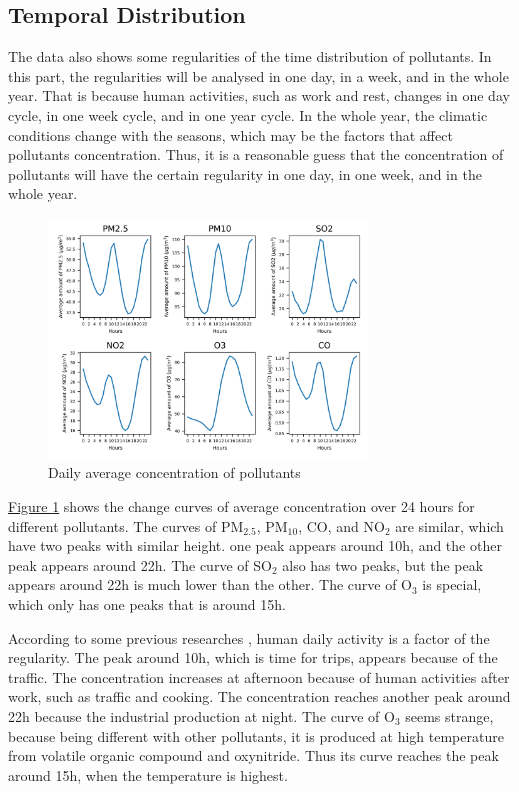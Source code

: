 \documentclass[letterpaper]{article}
\begin{document}
\begin{CJK*}{UTF8}{gkai}
\section{Temporal Distribution}

The data also shows some regularities of the time distribution of pollutants. In this part, the regularities will be analysed in one day, in a week, and in the whole year. That is because human activities, such as work and rest, changes in one day cycle, in one week cycle, and in one year cycle. In the whole year, the climatic conditions change with the seasons, which may be the factors that affect pollutants concentration. Thus, it is a reasonable guess that the concentration of pollutants will have the certain regularity in one day, in one week, and in the whole year.

\begin{figure}[h]
  \includegraphics[width = 8.5cm]{dailyavg_pltn.png}
  \caption{Daily average concentration of pollutants}
  \label{figure:2}
\end{figure}

\hyperref[figure:2]{Figure \ref*{figure:2}} shows the change curves of average concentration over 24 hours for different pollutants. The curves of PM$_{2.5}$, PM$_{10}$, CO, and NO$_{2}$ are similar, which have two peaks with similar height. one peak appears around 10h, and the other peak appears around 22h. The curve of SO$_{2}$ also has two peaks, but the peak appears around 22h is much lower than the other. The curve of O$_{3}$ is special, which only has one peaks that is around 15h.

According to some previous researches , human daily activity is a factor of the regularity. The peak around 10h, which is time for trips, appears because of the traffic. The concentration increases at afternoon because of human activities after work, such as traffic and cooking. The concentration reaches another peak around 22h because the industrial production at night. The curve of O$_{3}$ seems strange, because being different with other pollutants, it is produced at high temperature from volatile organic compound and oxynitride. Thus its curve reaches the peak around 15h, when the temperature is highest.


\end{CJK*}
\end{document}
